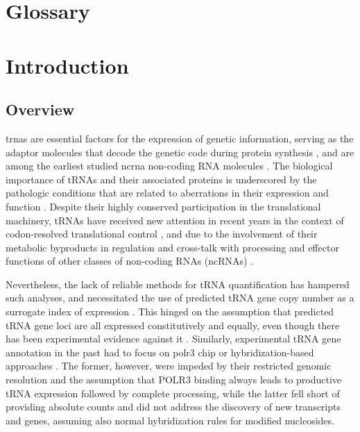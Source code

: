 \documentclass[12pt]{rockefeller}
\begin{document}
\chapter*{Glossary}
\printglossary[type=\acronymtype,nonumberlist,title={List of Abbreviations}]
\printglossary[nonumberlist,title={List of Terms}]
\mainmatter
\pagestyle{fancy}
\fancyhf{}
\lhead{\chaptername\ \thechapter}
\rhead{\thesection}
\rfoot{\thepage}

\chapter{Introduction}
\section{Overview}
\glspl{trna} are essential factors for the expression of genetic information, serving as the adaptor molecules that decode the genetic code during protein synthesis \cite{Crick:1955}, and are among the earliest studied \gls{ncrna} non-coding RNA molecules \cite{Woese:1967, Soll:1995}. The biological importance of tRNAs and their associated proteins is underscored by the pathologic conditions that are related to aberrations in their expression and function \cite{Cooper:2009da, Park:2008gg, Griffiths:2011ge, McFarland:2004fz}.
Despite their highly conserved participation in the translational machinery, tRNAs have received new attention in recent years in the context of codon-resolved translational control \cite{Dana:2012kq,Dana:2014bs,Mahlab:2012dg,Plotkin:2010fu,Tuller:2010ge,Weinberg:2016kh}, and due to the involvement of their metabolic byproducts in regulation and cross-talk with processing and effector functions of other classes of non-coding RNAs (ncRNAs) \cite{Hasler:2016ce,Ivanov:2011iu,Lee:2009fb,Haussecker:2010hda, Babiarz:2008bs}.

Nevertheless, the lack of reliable methods for tRNA quantification has hampered such analyses, and necessitated the use of predicted tRNA gene copy number as a surrogate index of expression \cite{Iben:2014dt,Pechmann:2012ey,Tuller:2010ge}. This hinged on the assumption that predicted tRNA gene loci are all expressed constitutively and equally, even though there has been experimental evidence against it \cite{Gingold:2014iz}. Similarly, experimental tRNA gene annotation in the past had to focus on \gls{polr3} \gls{chip} \cite{Moqtaderi:2010hc, Oler:2010fb, Kutter:2011ff} or hybridization-based approaches \cite{Dittmar:2004fb, Goodarzi:2016gd}. The former, however, were impeded by their restricted genomic resolution and the assumption that POLR3 binding always leads to productive tRNA expression followed by complete processing, while the latter fell short of providing absolute counts and did not address the discovery of new transcripts and genes, assuming also normal hybridization rules for modified nucleosides.
\end{document}

